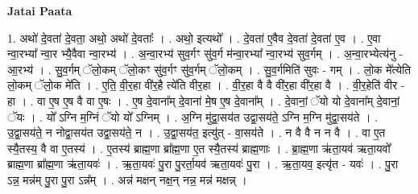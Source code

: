 \documentclass[17pt]{extarticle}
\begin{document}
\textbf{Jatai Paata} \newline

1. अथो॑ दे॒वता॑ दे॒वता॒ अथो॒ अथो॑ दे॒वताः᳚ । . अथो॒ इत्यथो᳚ । . दे॒वता॑ ए॒वैव दे॒वता॑ दे॒वता॑ ए॒व । . ए॒वा न्वा॒रभ्या᳚ न्वा॒र भ्यै॒वैवा न्वा॒रभ्य॑ । . अ॒न्वा॒रभ्य॑ सुव॒र्गꣳ सु॑व॒र्ग म॑न्वा॒रभ्या᳚ न्वा॒रभ्य॑ सुव॒र्गम् । . अ॒न्वा॒रभ्येत्य॑नु - आ॒रभ्य॑ । . सु॒व॒र्गम् ॅलो॒कम् ॅलो॒कꣳ सु॑व॒र्गꣳ सु॑व॒र्गम् ॅलो॒कम् । . सु॒व॒र्गमिति॑ सुवः - गम् । . लो॒क मे᳚त्येति लो॒कम् ॅलो॒क मे॑ति । . ए॒ति॒ वी॒र॒हा वी॑र॒है त्ये॑ति वीर॒हा । . वी॒र॒हा वै वै वी॑र॒हा वी॑र॒हा वै । . वी॒र॒हेति॑ वीर - हा । . वा ए॒ष ए॒ष वै वा ए॒षः । . ए॒ष दे॒वाना᳚म् दे॒वाना॑ मे॒ष ए॒ष दे॒वाना᳚म् । . दे॒वानां॒ ॅयो यो दे॒वाना᳚म् दे॒वानां॒ ॅयः । . यो᳚ ऽग्नि म॒ग्निं ॅयो यो᳚ ऽग्निम् । . अ॒ग्नि मु॑द्वा॒सय॑त उद्वा॒सय॑ते॒ ऽग्नि म॒ग्नि मु॑द्वा॒सय॑ते । . उ॒द्वा॒सय॑ते॒ न नोद्वा॒सय॑त उद्वा॒सय॑ते॒ न । . उ॒द्वा॒सय॑त॒ इत्यु॑त् - वा॒सय॑ते । . न वै वै न न वै । . वा ए॒त स्यै॒तस्य॒ वै वा ए॒तस्य॑ । . ए॒तस्य॑ ब्राह्म॒णा ब्रा᳚ह्म॒णा ए॒त स्यै॒तस्य॑ ब्राह्म॒णाः । . ब्रा॒ह्म॒णा ऋ॑ता॒यव॑ ऋता॒यवो᳚ ब्राह्म॒णा ब्रा᳚ह्म॒णा ऋ॑ता॒यवः॑ । . ऋ॒ता॒यवः॑ पु॒रा पु॒रर्ता॒यव॑ ऋता॒यवः॑ पु॒रा । . ऋ॒ता॒यव॒ इत्यृ॑त - यवः॑ । . पु॒रा ऽन्न॒ मन्न॑म् पु॒रा पु॒रा ऽन्न᳚म् । . अन्न॑ मक्षन् नक्ष॒न् नन्न॒ मन्न॑ मक्षन्न् । \newline
\end{document}
